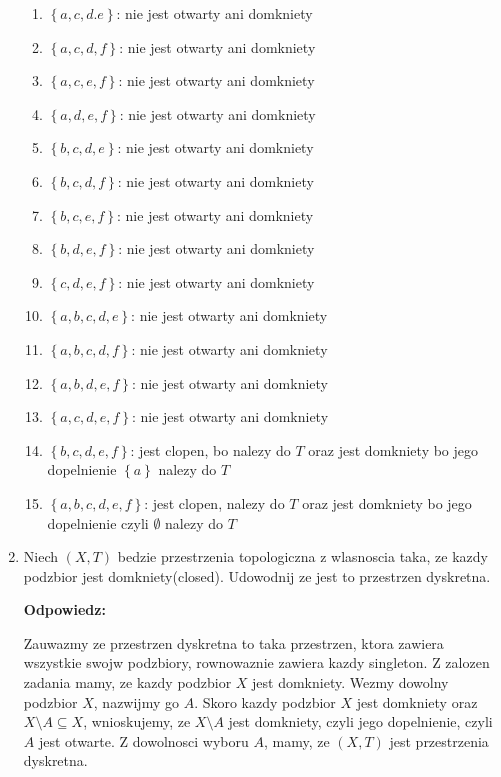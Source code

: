 \documentclass{article}
\begin{document}
\begin{enumerate}
\begin{enumerate}[label=\arabic*.]
            \item $\left\{ a,c,d.e \right\}$: nie jest otwarty ani domkniety
            \item $\left\{ a,c,d,f \right\}$: nie jest otwarty ani domkniety

            \item $\left\{ a,c,e,f \right\}$: nie jest otwarty ani domkniety
            \item $\left\{ a,d,e,f \right\}$: nie jest otwarty ani domkniety
            \item $\left\{ b,c,d,e \right\}$: nie jest otwarty ani domkniety
            \item $\left\{ b,c,d,f \right\}$: nie jest otwarty ani domkniety
            \item $\left\{ b,c,e,f \right\}$: nie jest otwarty ani domkniety
            \item $\left\{ b,d,e,f \right\}$: nie jest otwarty ani domkniety
            \item $\left\{ c,d,e,f \right\}$: nie jest otwarty ani domkniety
            \item $\left\{ a,b,c,d,e \right\}$: nie jest otwarty ani domkniety
            \item $\left\{ a,b,c,d,f \right\}$: nie jest otwarty ani domkniety
            \item $\left\{ a,b,d,e,f \right\}$: nie jest otwarty ani domkniety
            \item $\left\{ a,c,d,e,f \right\}$: nie jest otwarty ani domkniety
            \item $\left\{ b,c,d,e,f \right\}$: jest clopen, bo nalezy do $T$ oraz jest domkniety bo jego dopelnienie $\left\{ a \right\}$ nalezy do $T$
            \item $\left\{ a,b,c,d,e,f \right\}$: jest clopen, nalezy do $T$ oraz jest domkniety bo jego dopelnienie czyli $\emptyset$ nalezy do $T$

        \end{enumerate} %
    \item Niech $(X,T)$ bedzie przestrzenia topologiczna z wlasnoscia taka, ze kazdy podzbior jest domkniety(closed). Udowodnij ze jest to przestrzen dyskretna.

        \textbf{Odpowiedz:}

        Zauwazmy ze przestrzen dyskretna to taka przestrzen, ktora zawiera wszystkie swojw podzbiory, rownowaznie zawiera kazdy singleton.
        Z zalozen zadania mamy, ze kazdy podzbior $X$ jest domkniety. Wezmy dowolny podzbior $X$, nazwijmy go $A$. Skoro kazdy podzbior $X$ jest domkniety oraz $X \setminus A \subseteq X$, wnioskujemy, ze $X \setminus A$ jest domkniety, czyli jego dopelnienie, czyli $A$ jest otwarte. Z dowolnosci wyboru $A$, mamy, ze $(X,T)$ jest przestrzenia dyskretna.


\end{enumerate}
\end{document}
